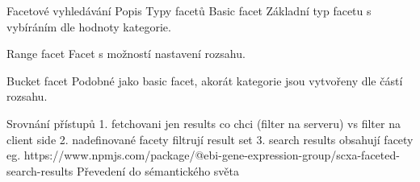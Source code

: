\chap Facetové vyhledávání
	\sec Popis
	\sec Typy facetů
		\secc Basic facet
		Základní typ facetu s vybíráním dle hodnoty kategorie.

		\secc Range facet
		Facet s možností nastavení rozsahu.

		\secc Bucket facet
		Podobné jako basic facet, akorát kategorie jsou vytvořeny dle částí rozsahu.
		
	\sec Srovnání přístupů
		1. fetchovani jen results co chci (filter na serveru) vs filter na client side
		2. nadefinované facety filtrují result set
		3. search results obsahují facety eg. https://www.npmjs.com/package/@ebi-gene-expression-group/scxa-faceted-search-results
	\sec Převedení do sémantického světa
